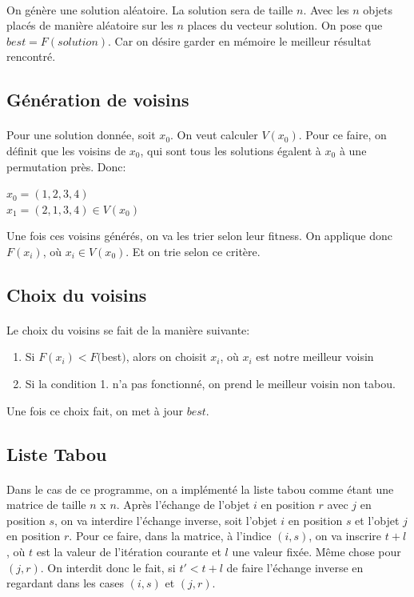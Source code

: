 \documentclass[a4paper, 11pt]{article}
\begin{document}
\paragraph{}On génère une solution aléatoire. La solution sera de taille $n$. Avec les $n$ objets placés de manière aléatoire sur les $n$
places du vecteur solution.
On pose que $best = F(solution)$. Car on désire garder en mémoire le meilleur résultat rencontré.

\subsection{Génération de voisins}
\paragraph{}
Pour une solution donnée, soit $x_0$. On veut calculer $V(x_0)$.
Pour ce faire, on définit que les voisins de $x_0$, qui sont tous les solutions égalent à $x_0$ à une permutation près.
Donc:
\begin{center}
  $x_0 = (1,2,3,4)$\\
  $x_1 = (2,1,3,4) \in V(x_0)$
\end{center}

Une fois ces voisins générés, on va les trier selon leur fitness. On applique donc $F(x_i)$, où $x_i \in V(x_0)$. Et on trie selon
ce critère.

\subsection{Choix du voisins}
\paragraph{}
Le choix du voisins se fait de la manière suivante:
\begin{enumerate}
 \item Si $F(x_i) < F($best$)$, alors on choisit $x_i$, où $x_i$ est notre meilleur voisin
 \item Si la condition 1. n'a pas fonctionné, on prend le meilleur voisin non tabou.
\end{enumerate}

Une fois ce choix fait, on met à jour $best$.

\subsection{Liste Tabou}
\paragraph{}
Dans le cas de ce programme, on a implémenté la liste tabou comme étant une matrice de taille $n$ x $n$.
Après l'échange de l'objet $i$ en position $r$ avec $j$ en position $s$, on va interdire l'échange inverse, soit l'objet $i$ en position 
$s$ et l'objet $j$ en position $r$.
Pour ce faire, dans la matrice, à l'indice $(i,s)$, on va inscrire $t+l$, où $t$ est la valeur de l'itération courante et $l$ une valeur
fixée. Même chose pour $(j,r)$.
On interdit donc le fait, si $t' < t+l$ de faire l'échange inverse en regardant dans les cases $(i,s)$ et $(j,r)$.
\end{document}

